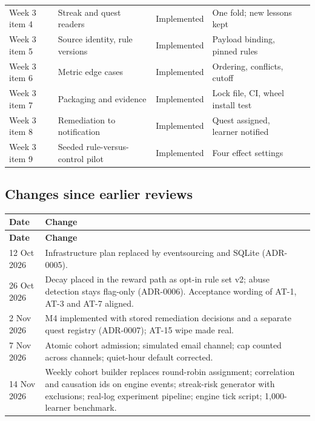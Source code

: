\documentclass[11pt,a4paper]{article}
\newcommand{\hdr}[1]{\textbf{\color{white}\sffamily\small #1}}
\renewcommand{\_}{\textunderscore\allowbreak{}}
\begin{document}
{\begin{longtable}{@{}L{2.4cm} L{3.3cm} L{1.9cm} L{3.2cm} L{3.1cm}@{}}
Week 3 item 4 & Streak and quest readers & Implemented & One fold; new lessons kept &  \\
 Week 3 item 5 & Source identity, rule versions & Implemented & Payload binding, pinned rules &  \\
Week 3 item 6 & Metric edge cases & Implemented & Ordering, conflicts, cutoff &  \\
 Week 3 item 7 & Packaging and evidence & Implemented & Lock file, CI, wheel install test &  \\
Week 3 item 8 & Remediation to notification & Implemented & Quest assigned, learner notified &  \\
 Week 3 item 9 & Seeded rule-versus-control pilot & Implemented & Four effect settings &  \\
\end{longtable}
}

\subsection{Changes since earlier reviews}

\begin{xltabular}{\textwidth}{@{}L{2.6cm} Y@{}}
 \hdr{Date} & \hdr{Change} \\
\endfirsthead
{} \hdr{Date} & \hdr{Change} \\
\endhead
{} 12 Oct 2026 & Infrastructure plan replaced by eventsourcing and SQLite (ADR-0005). \\
26 Oct 2026 & Decay placed in the reward path as opt-in rule set v2; abuse detection stays flag-only (ADR-0006). Acceptance wording of AT-1, AT-3 and AT-7 aligned. \\
 2 Nov 2026 & M4 implemented with stored remediation decisions and a separate quest registry (ADR-0007); AT-15 wipe made real. \\
7 Nov 2026 & Atomic cohort admission; simulated email channel; cap counted across channels; quiet-hour default corrected. \\
 14 Nov 2026 & Weekly cohort builder replaces round-robin assignment; correlation and causation ids on engine events; streak-risk generator with exclusions; real-log experiment pipeline; engine tick script; 1,000-learner benchmark. \\
\end{xltabular}
\end{document}
